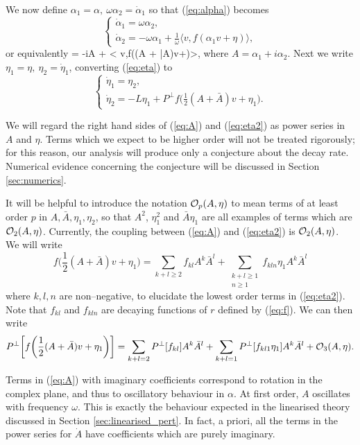 We now define $\alpha_1=\alpha,\ \omega\alpha_2=\dot{\alpha}_1$  so that (\ref{eq:alpha}) becomes
\[
\begin{cases} \nonumber
\dot{\alpha}_1 = \omega\alpha_2, \\
\dot{\alpha}_2 = - \omega\alpha_1 + \frac{1}{\omega}\langle v, f(\alpha_1 v+\eta)\rangle,
\end{cases}
\]
or equivalently
\be \label{eq:A}
 = -i\omega A + \bigg< v,f\bigg((A + \bar{A})v+\eta\bigg)\bigg>,
\ee
where $A=\alpha_1 + i\alpha_2$. Next we write $\eta_1=\eta,\ \eta_2=\dot{\eta}_1$, converting (\ref{eq:eta}) to
\[ \label{eq:eta2}
\begin{cases}
\dot{\eta}_1 =\eta_2, \\
\dot{\eta}_2 = -L\eta_1 + P^\perp f\big( \frac{1}{2} (A+\bar{A}) v + \eta_1\big).
\end{cases}
\]

We will regard the right hand sides of (\ref{eq:A}) and (\ref{eq:eta2}) as power series in $A$ and $\eta$. Terms which we expect to be higher order will not be treated rigorously; for this reason, our analysis will produce only a conjecture about the decay rate. Numerical evidence concerning the conjecture will be discussed in Section \ref{sec:numerics}.

It will be helpful to introduce the notation $\mathcal{O}_p(A,\eta)$ to mean terms of at least order $p$ in $A,\bar{A},\eta_1,\eta_2$, so that $A^2$, $\eta_1^2 $ and $\bar{A}\eta_1$ are all examples of terms which are $\mathcal{O}_2(A,\eta)$. Currently, the coupling between (\ref{eq:A}) and (\ref{eq:eta2}) is $\mathcal{O}_2(A,\eta)$. We will write
\[
f\bigg( \frac{1}{2} (A+\bar{A}) v + \eta_1\bigg) = \sum_{k+l\geq 2} f_{kl}A^k\bar{A}^l + \sum_{\substack{k+l\geq 1 \\ n\geq 1}} f_{kln}\eta_1A^k\bar{A}^l
\]
where $k,l,n$ are non--negative, to elucidate the lowest order terms in (\ref{eq:eta2}). Note that $f_{kl}$ and $f_{kln}$ are decaying functions of $r$ defined by (\ref{eq:f}). We can then write
\[
P^\perp\bigg[ f\bigg( \frac{1}{2} (A+\bar{A}) v + \eta_1\bigg) \bigg] = \sum_{k+l=2} P^\perp[f_{kl}]A^k\bar{A}^l + \sum_{k+l=1} P^\perp [f_{kl1}\eta_1]A^k\bar{A}^l + \mathcal{O}_3(A,\eta).
\]



Terms in (\ref{eq:A}) with imaginary coefficients correspond to rotation in the complex plane, and thus to oscillatory behaviour in $\alpha$. At first order, $A$ oscillates with frequency $\omega$. This is exactly the behaviour expected in the linearised theory discussed in Section \ref{sec:linearised_pert}. In fact, a priori, all the terms in the power series for $\dot{A}$ have coefficients which are purely imaginary.

